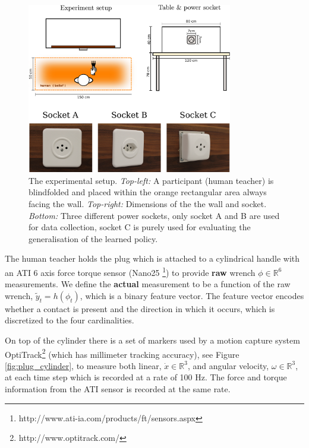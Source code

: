 \documentclass[final,3p,times,twocolumn]{elsarticle}
\begin{document}
\begin{figure}
 \centering
 \includegraphics[width=0.8\textwidth]{./Figures/Fig/experiment_setup_and_design.pdf}
 \caption{The experimental setup. \textit{Top-left:} A participant (human teacher) is blindfolded and 
    placed within the orange rectangular area always facing the wall. \textit{Top-right:} Dimensions of the 
    the wall and socket. \textit{Bottom:} Three different power sockets, only socket A and B are used for data collection, socket
    C is purely used for evaluating the generalisation of the learned policy.}
    \label{fig:search_task_setup}
\end{figure}

The human teacher holds the plug which is attached to a cylindrical handle with 
an ATI 6 axis force torque sensor (Nano25 \footnote{http://www.ati-ia.com/products/ft/sensors.aspx}) 
to provide \textbf{raw} wrench $\phi \in \mathbb{R}^6$ measurements. We define the \textbf{actual} measurement 
to be a function of the raw wrench, $\tilde{y}_t = h(\phi_t)$, which is a binary feature vector. The feature vector encodes whether a contact is present 
and the direction in which it occurs, which is discretized to the four cardinalities.

On top of the cylinder there is a set of markers used by a motion capture system OptiTrack\footnote{http://www.optitrack.com/}
(which has millimeter tracking accuracy), 
see Figure \ref{fig:plug_cylinder}, to measure both linear, $\dot{x} \in \mathbb{R}^3$, and angular 
velocity, $\omega \in \mathbb{R}^3$, at each time step which is recorded at a rate of 100 Hz. The force and torque information 
from the ATI sensor is recorded at the same rate. 
\end{document}
